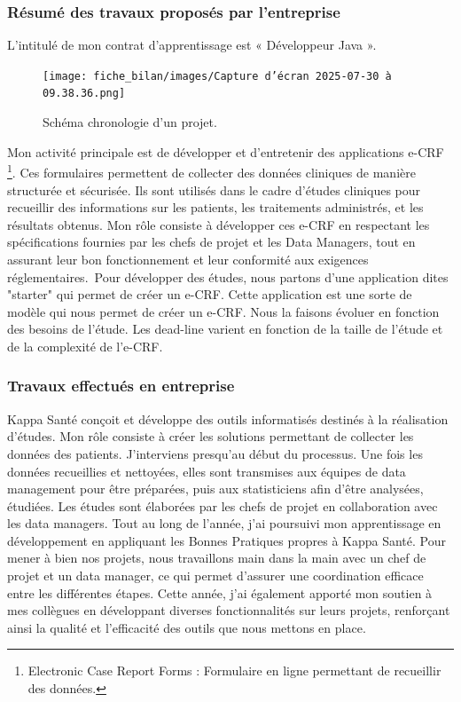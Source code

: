 \subsubsection{Résumé des travaux proposés par l'entreprise}
L'intitulé de mon contrat d'apprentissage est « Développeur Java ».
\begin{figure}[H]
    \centering
    \texttt{[image: fiche\_bilan/images/Capture d’écran 2025-07-30 à 09.38.36.png]} 
    \caption{Schéma chronologie d'un projet.}
\end{figure}
Mon activité principale est de développer et d’entretenir des applications
 e-CRF \footnote{Electronic Case Report Forms : Formulaire en ligne permettant de recueillir des données.}. Ces formulaires permettent de collecter des données cliniques de manière structurée et sécurisée. Ils sont utilisés dans le cadre d'études cliniques pour recueillir des informations sur les patients, les traitements administrés, et les résultats obtenus. Mon rôle consiste à développer ces e-CRF en respectant les spécifications fournies par les chefs de projet et les Data Managers, tout en assurant leur bon fonctionnement et leur conformité aux exigences réglementaires.\
Pour développer des études, nous partons d'une application dites "starter" qui
permet de créer un e-CRF. Cette application est une sorte de modèle qui nous
permet de créer un e-CRF. Nous la faisons évoluer en fonction des
besoins de l'étude. Les dead-line varient en fonction de la taille de l'étude et de la
complexité de l'e-CRF. 
\subsubsection{Travaux effectués en entreprise}
Kappa Santé conçoit et développe des outils informatisés destinés à la réalisation d’études. Mon rôle consiste à créer les solutions permettant de collecter les données des patients. J’interviens presqu'au début du processus. Une fois les données recueillies et nettoyées, elles sont transmises aux équipes de data management pour être préparées, puis aux statisticiens afin d’être analysées, étudiées.
Les études sont élaborées par les chefs de projet en collaboration avec les data managers. Tout au long de l’année, j’ai poursuivi mon apprentissage en développement en appliquant les Bonnes Pratiques propres à Kappa Santé.
Pour mener à bien nos projets, nous travaillons main dans la main avec un chef de projet et un data manager, ce qui permet d’assurer une coordination efficace entre les différentes étapes. Cette année, j’ai également apporté mon soutien à mes collègues en développant diverses fonctionnalités sur leurs projets, renforçant ainsi la qualité et l’efficacité des outils que nous mettons en place.

